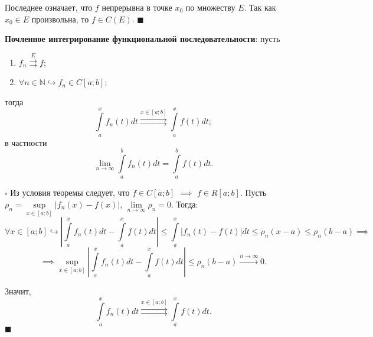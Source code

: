 \documentclass[12pt, a4paper, reqno]{article}
\begin{document}
    Последнее означает, что $f$ непрерывна в точке $x_0$ по множеству $E$. Так как $x_0 \in E$
    произвольна, то $f \in C(E)$.
    $\blacksquare$

    \textbf{Почленное интегрирование функциональной последовательности}: пусть
    \begin{enumerate}
        \item $f_n \overset{E}{\rightrightarrows} f$;
        \item $\forall n \in \mathbb{N} \hookrightarrow f_n \in C[a; b]$;
    \end{enumerate}
    тогда
    \begin{equation*}
        \int\limits_{a}^{x} f_n(t)dt \overset{x \in [a; b]}{\rightrightarrows} \int\limits_{a}^{x} f(t)dt;
    \end{equation*}
    в частности
    \begin{equation*}
        \lim\limits_{n \to \infty} \int\limits_{a}^{b} f_n(t)dt = \int\limits_{a}^{b} f(t)dt.
    \end{equation*}

    $\square$
    Из условия теоремы следует, что $f \in C[a; b]$ $\implies$ $f \in R[a; b]$. Пусть
    $\rho_n = \sup\limits_{x \in [a; b]} |f_n(x) - f(x)|$, $\lim\limits_{n \to \infty} \rho_n = 0$.
    Тогда:
    \begin{equation*}
        \forall x \in [a; b] \hookrightarrow
        \left|\int\limits_{a}^{x} f_n(t)dt - \int\limits_{a}^{x} f(t)dt\right| \leq
        \int\limits_{a}^{x} |f_n(t) - f(t)|dt \leq \rho_n (x - a) \leq \rho_n (b - a) \implies
    \end{equation*}
    \begin{equation*}
        \implies \sup\limits_{x \in [a; b]}
            \left|\int\limits_{a}^{x} f_n(t)dt - \int\limits_{a}^{x} f(t)dt\right| \leq
        \rho_n (b - a) \overset{n \to \infty}{\longrightarrow} 0.
    \end{equation*}

    Значит,
    \begin{equation*}
        \int\limits_{a}^{x} f_n(t)dt \overset{x \in [a; b]}{\rightrightarrows} \int\limits_{a}^{x} f(t)dt.
    \end{equation*}
    $\blacksquare$
\end{document}
